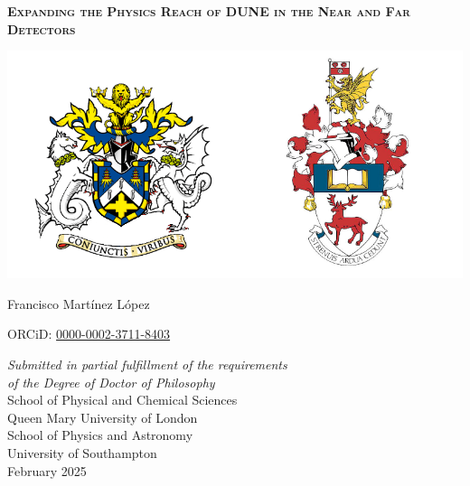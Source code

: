 \begin{titlepage}



\begin{center}

\begin{spacing}{2.5}
{\Huge \textsc{\textbf{Expanding the Physics Reach of DUNE in the Near and Far Detectors}}}
\end{spacing}

\vspace{0.7 cm}

\begin{center}
\includegraphics[width=1.0\textwidth]{Images/uni_arms}
\end{center}
\vspace{0.9cm}


{\LARGE Francisco Mart\'{i}nez L\'{o}pez} %

\vspace{0.05cm}

{ORCiD: \href{http://orcid.org/0000-0002-3711-8403}{0000-0002-3711-8403}} %

\vspace{1.0cm}

{\large %
\textit{Submitted in partial fulfillment of the
requirements \\ of the Degree of Doctor of Philosophy}\\
\vspace{1.0 cm}
School of Physical and Chemical Sciences\\
Queen Mary University of London\\
\vspace{0.5 cm}
School of Physics and Astronomy\\
University of Southampton\\
\vspace{0.5cm}
February 2025 %
}


\end{center}
\end{titlepage}
